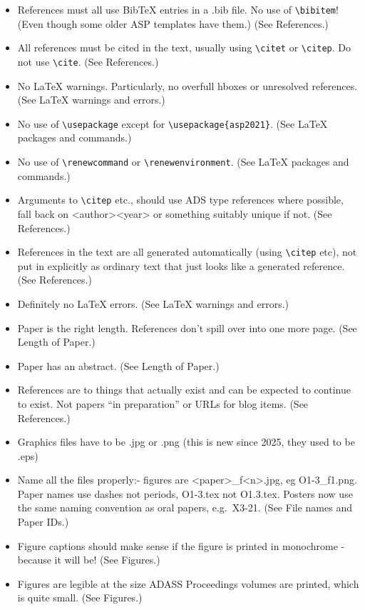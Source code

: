 \documentclass[11pt,twoside]{article}
\begin{document}
\begin{itemize}
\checklistitemize

\item References must all use BibTeX entries in a .bib file. No use of \verb"\bibitem"! (Even though some older ASP templates have them.) (See References.)
\item All references must be cited in the text, usually using \verb"\citet" or \verb"\citep".  Do not use \verb"\cite". (See References.)
\item No LaTeX warnings. Particularly, no overfull hboxes or unresolved references. (See LaTeX warnings and errors.)
\item No use of \verb"\usepackage" except for \verb"\usepackage{asp2021}". (See LaTeX packages and commands.)
\item No use of \verb"\renewcommand" or \verb"\renewenvironment". (See LaTeX packages and commands.)
\item Arguments to \verb"\citep" etc., should use ADS type references where possible, fall back on <author><year> or something suitably unique if not. (See References.)
\item References in the text are all generated automatically (using \verb"\citep" etc), not put in explicitly as ordinary text that just looks like a generated reference. (See References.)
\item Definitely no LaTeX errors. (See LaTeX warnings and errors.)
\item Paper is the right length. References don't spill over into one more page. (See Length of Paper.)
\item Paper has an abstract. (See Length of Paper.)
\item References are to things that actually exist and can be expected to continue to exist. Not papers ``in preparation'' or URLs for blog items. (See References.)
\item Graphics files have to be .jpg or .png (this is new since 2025, they used to be .eps)
\item Name all the files properly:- figures are <paper>\_f<n>.jpg, eg O1-3\_f1.png. Paper names use dashes not periods, O1-3.tex not O1.3.tex. Posters now use the same naming convention as oral papers, e.g.\ X3-21. (See File names and Paper IDs.)
\item Figure captions should make sense if the figure is printed in monochrome - because it will be! (See Figures.)
\item Figures are legible at the size ADASS Proceedings volumes are printed, which is quite small. (See Figures.)

\end{itemize}
\end{document}
